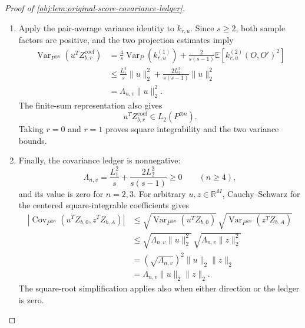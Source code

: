 \begin{proof}[Proof of \cref{obj:lem:original-score-covariance-ledger}]
\begin{enumerate}
\item Apply the pair-average variance identity to \(k_{r,u}\). Since \(s\ge2\), both sample factors are positive, and the two projection estimates imply
\[
\begin{aligned}
\operatorname{Var}_{P^{\otimes n}}(u^TZ_{b,r}^{\mathrm{coef}})
&=
\frac4s\operatorname{Var}_P(k_{r,u}^{(1)})
+
\frac{2}{s(s-1)}
\mathbb E[k_{r,u}^{(2)}(O,O')^2]\\
&\le
\frac{L_1^2}{s}\|u\|_2^2
+
\frac{2L_2^2}{s(s-1)}\|u\|_2^2\\
&=
\Lambda_{n,v}\|u\|_2^2.
\end{aligned}
\]
The finite-sum representation also gives
\[
u^TZ_{b,r}^{\mathrm{coef}}\in L_2(P^{\otimes n}).
\]
Taking \(r=0\) and \(r=1\) proves square integrability and the two variance bounds.

\item Finally, the covariance ledger is nonnegative:
\[
\Lambda_{n,v}
=
\frac{L_1^2}{s}
+
\frac{2L_2^2}{s(s-1)}
\ge0
\qquad(n\ge4),
\]
and its value is zero for \(n=2,3\). For arbitrary \(u,z\in\mathbb R^M\), Cauchy--Schwarz for the centered square-integrable coefficients gives
\[
\begin{aligned}
\left|
\operatorname{Cov}_{P^{\otimes n}}
(u^TZ_{b,0},z^TZ_{b,A})
\right|
&\le
\sqrt{\operatorname{Var}_{P^{\otimes n}}(u^TZ_{b,0})}\,
\sqrt{\operatorname{Var}_{P^{\otimes n}}(z^TZ_{b,A})}\\
&\le
\sqrt{\Lambda_{n,v}\|u\|_2^2}\,
\sqrt{\Lambda_{n,v}\|z\|_2^2}\\
&=
(\sqrt{\Lambda_{n,v}})^2\|u\|_2\|z\|_2\\
&=
\Lambda_{n,v}\|u\|_2\|z\|_2.
\end{aligned}
\]
The square-root simplification applies also when either direction or the ledger is zero.
\end{enumerate}
\end{proof}
